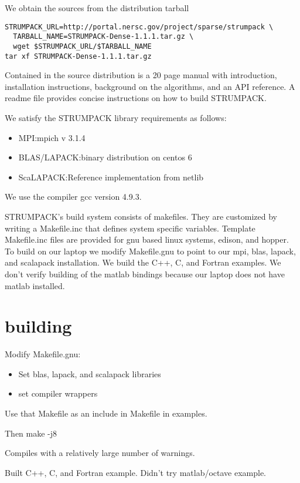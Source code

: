 \documentclass{acmsmall}
\begin{document}
We obtain the sources from the distribution tarball
\begin{verbatim}
STRUMPACK_URL=http://portal.nersc.gov/project/sparse/strumpack \
  TARBALL_NAME=STRUMPACK-Dense-1.1.1.tar.gz \
  wget $STRUMPACK_URL/$TARBALL_NAME
tar xf STRUMPACK-Dense-1.1.1.tar.gz
\end{verbatim}

Contained in the source distribution is a 20 page manual with
introduction, installation instructions, background on the
algorithms, and an API reference.  A readme file
provides concise instructions on how to build STRUMPACK.

We satisfy the STRUMPACK library requirements as follows:
\begin{itemize}
\item MPI:\@ mpich v 3.1.4
\item BLAS/LAPACK:\@ binary distribution on centos 6
\item ScaLAPACK:\@ Reference implementation from netlib~\cite{netlib}
\end{itemize}

We use the compiler gcc version 4.9.3.

STRUMPACK's build system consists of makefiles.  They are
customized by writing a Makefile.inc that defines system specific
variables.  Template Makefile.inc files are provided for gnu
based linux systems, edison, and hopper.  To build on our laptop
we modify Makefile.gnu to point to our mpi, blas, lapack, and
scalapack installation.  We build the C++, C, and Fortran
examples.  We don't verify building of the matlab bindings
because our laptop does not have matlab installed.


\section{building}

Modify Makefile.gnu:
\begin{itemize}
\item Set blas, lapack, and scalapack libraries
\item set compiler wrappers
\end{itemize}

Use that Makefile as an include in Makefile in examples.

Then make -j8


Compiles with a relatively large number of warnings.

Built C++, C, and Fortran example.  Didn't try matlab/octave example.
\end{document}
